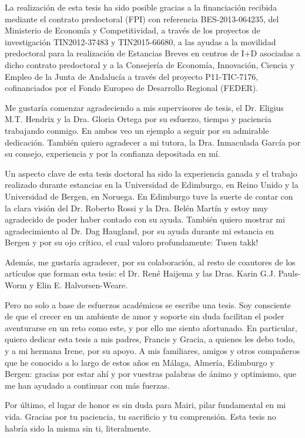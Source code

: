 \begin{Agradecimientos}
	La realizaci\'on de esta tesis ha sido posible gracias a la financiaci\'on recibida mediante el contrato predoctoral (FPI) con referencia BES-2013-064235, del Ministerio de Econom\'ia y Competitividad, a trav\'es de los proyectos de investigaci\'on TIN2012-37483 y TIN2015-66680, a las ayudas a la movilidad predoctoral para la realizaci\'on de Estancias Breves en centros de I+D asociadas a dicho contrato predoctoral y a la Consejer\'ia de Econom\'ia, Innovaci\'on, Ciencia y Empleo de la Junta de Andaluc\'ia a trav\'es del proyecto P11-TIC-7176, cofinanciados por el Fondo Europeo de Desarrollo Regional (FEDER).
	
	Me gustar\'ia comenzar agradeciendo a mis supervisores de tesis, el Dr. Eligius M.T. Hendrix y la Dra. Gloria Ortega por su esfuerzo, tiempo y paciencia trabajando conmigo. En ambos veo un ejemplo a seguir por su admirable dedicaci\'on. Tambi\'en quiero agradecer a mi tutora, la Dra. Inmaculada Garc\'ia por su consejo, experiencia y por la confianza depositada en m\'i.
	
	Un aspecto clave de esta tesis doctoral ha sido la experiencia ganada y el trabajo realizado durante estancias en la Universidad de Edimburgo, en Reino Unido y la Universidad de Bergen, en Noruega. En Edimburgo tuve la suerte de contar con la clara visi\'on del Dr. Roberto Rossi y la Dra. Bel\'en Mart\'in y estoy muy agradecido de poder haber contado con su ayuda. Tambi\'en quiero mostrar mi agradecimiento al Dr. Dag Haugland, por su ayuda durante mi estancia en Bergen y por su ojo cr\'itico, el cual valoro profundamente: Tusen takk!
	
	Adem\'as, me gustar\'ia agradecer, por su colaboraci\'on, al resto de coautores de los art\'iculos que forman esta tesis: el Dr. Ren\'e Haijema y las Dras. Karin G.J. Pauls-Worm y Elin E. Halvorsen-Weare.
	
	Pero no solo a base de esfuerzos acad\'emicos se escribe una tesis. Soy consciente de que el crecer en un ambiente de amor y soporte sin duda facilitan el poder aventurarse en un reto como este, y por ello me siento afortunado. En particular, quiero dedicar esta tesis a mis padres, Francis y Gracia, a quienes les debo todo, y a mi hermana Irene, por su apoyo. A mis familiares, amigos y otros compa\~neros que he conocido a lo largo de estos a\~nos en M\'alaga, Almer\'ia, Edimburgo y Bergen: gracias por estar ah\'i y por vuestras palabras de \'animo y optimismo, que me han ayudado a continuar con m\'as fuerzas.
	
	Por \'ultimo, el lugar de honor es sin duda para Mairi, pilar fundamental en mi vida. Gracias por tu paciencia, tu sacrificio y tu comprensi\'on. Esta tesis no habr\'ia sido la misma sin ti, literalmente.
	
\end{Agradecimientos}